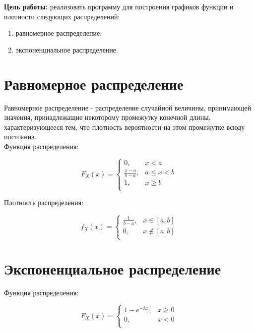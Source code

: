 \documentclass[a4paper, 14pt]{article}
\begin{document}


\textbf{Цель работы:} реализовать программу для построения графиков функции и плотности следующих распределений:
\begin{enumerate}
    \item равномерное распределение;
    \item экспоненциальное распределение. 
\end{enumerate}
	
\section*{Равномерное распределение}
	
Равномерное распределение - распределение случайной величины, принимающей значения, принадлежащие некоторому промежутку конечной длины, характеризующееся тем, что плотность вероятности на этом промежутке всюду постоянна.\\

Функция распределения:

\begin{equation*}
F_X (x) =
    \begin{cases}
        0, & x < a \\
        \frac{x - a}{b - a}, & a \le x < b \\
        1, & x \geq b \\
    \end{cases}
\end{equation*}
	
Плотность распределения:

\begin{equation*}
    f_X (x) =
    \begin{cases}
        \frac{1}{b-a}, & x \in [a,b] \\
        0, & x \notin [a, b] \\
    \end{cases}
\end{equation*}


\section*{Экспоненциальное распределение}

Функция распределения:

\begin{equation*}
F_X (x) =
    \begin{cases}
        1 - e^{-\lambda x},& x \geq 0 \\
        0, & x < 0 \\
    \end{cases}
\end{equation*}
	
\end{document}
